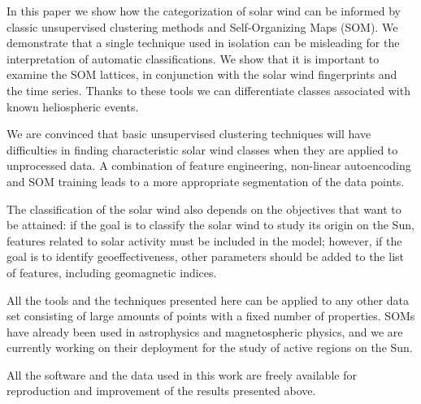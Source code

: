 In this paper we show how the categorization of solar wind can be informed by classic unsupervised clustering methods and Self-Organizing Maps (SOM). We demonstrate that a single technique used in isolation can be misleading for the interpretation of automatic classifications. We show that it is important to examine the SOM lattices, in conjunction with the solar wind fingerprints and the time series. Thanks to these tools we can differentiate classes associated with known heliospheric events.

We are convinced that basic unsupervised clustering techniques will have difficulties in finding characteristic solar wind classes when they are applied to unprocessed data. A combination of feature engineering, non-linear autoencoding and SOM training leads to a more appropriate segmentation of the data points.

The classification of the solar wind also depends on the objectives that want to be attained: if the goal is to classify the solar wind to study its origin on the Sun, features related to solar activity must be included in the model; however, if the goal is to identify geoeffectiveness, other parameters should be added to the list of features, including geomagnetic indices.

All the tools and the techniques presented here can be applied to any other data set consisting of large amounts of points with a fixed number of properties. SOMs have already been used in astrophysics\citep{Suveges2017} and magnetospheric physics\citep{Camporeale2018}, and we are currently working on their deployment for the study of active regions on the Sun.

All the software and the data used in this work are freely available for reproduction and improvement of the results presented above.
